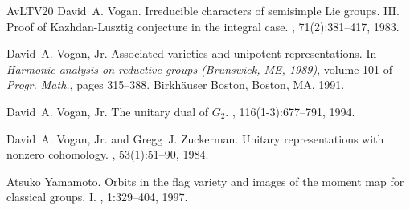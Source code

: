 \documentclass[a4paper, 11pt]{article}
\begin{document}
\begin{thebibliography}{AvLTV20}
David~A. Vogan.
\newblock Irreducible characters of semisimple {L}ie groups. {III}. {P}roof of
  {K}azhdan-{L}usztig conjecture in the integral case.
, 71(2):381--417, 1983.

David~A. Vogan, Jr.
\newblock Associated varieties and unipotent representations.
\newblock In {\em Harmonic analysis on reductive groups ({B}runswick, {ME},
  1989)}, volume 101 of {\em Progr. Math.}, pages 315--388. Birkh\"auser
  Boston, Boston, MA, 1991.

David~A. Vogan, Jr.
\newblock The unitary dual of {$G_2$}.
, 116(1-3):677--791, 1994.

David~A. Vogan, Jr. and Gregg~J. Zuckerman.
\newblock Unitary representations with nonzero cohomology.
, 53(1):51--90, 1984.

Atsuko Yamamoto.
\newblock Orbits in the flag variety and images of the moment map for classical
  groups. {I}.
, 1:329--404, 1997.

\end{thebibliography}
\end{document}
